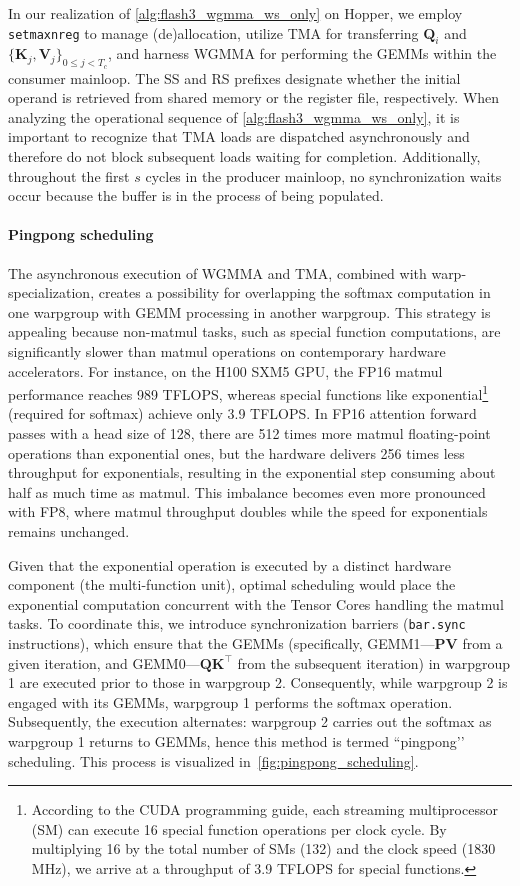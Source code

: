 In our realization of \cref{alg:flash3_wgmma_ws_only} on Hopper, we employ \verb|setmaxnreg| to manage (de)allocation, utilize TMA for transferring $\mathbf{Q}_i$ and $\{ \mathbf{K}_j, \mathbf{V}_j \}_{0 \leq j < T_c}$, and harness WGMMA for performing the GEMMs within the consumer mainloop. The SS and RS prefixes designate whether the initial operand is retrieved from shared memory or the register file, respectively. When analyzing the operational sequence of \cref{alg:flash3_wgmma_ws_only}, it is important to recognize that TMA loads are dispatched asynchronously and therefore do not block subsequent loads waiting for completion. Additionally, throughout the first $s$ cycles in the producer mainloop, no synchronization waits occur because the buffer is in the process of being populated.

\paragraph{Pingpong scheduling} The asynchronous execution of WGMMA and TMA, combined with warp-specialization, creates a possibility for overlapping the softmax computation in one warpgroup with GEMM processing in another warpgroup. This strategy is appealing because non-matmul tasks, such as special function computations, are significantly slower than matmul operations on contemporary hardware accelerators. For instance, on the H100 SXM5 GPU, the FP16 matmul performance reaches 989 TFLOPS, whereas special functions like exponential\footnote{According to the CUDA programming guide, each streaming multiprocessor (SM) can execute 16 special function operations per clock cycle. By multiplying 16 by the total number of SMs (132) and the clock speed (1830 MHz), we arrive at a throughput of 3.9 TFLOPS for special functions.} (required for softmax) achieve only 3.9 TFLOPS. In FP16 attention forward passes with a head size of 128, there are 512 times more matmul floating-point operations than exponential ones, but the hardware delivers 256 times less throughput for exponentials, resulting in the exponential step consuming about half as much time as matmul. This imbalance becomes even more pronounced with FP8, where matmul throughput doubles while the speed for exponentials remains unchanged.

Given that the exponential operation is executed by a distinct hardware component (the multi-function unit), optimal scheduling would place the exponential computation concurrent with the Tensor Cores handling the matmul tasks. To coordinate this, we introduce synchronization barriers (\texttt{bar.sync} instructions), which ensure that the GEMMs (specifically, GEMM1—$\mathbf{P} \mathbf{V}$ from a given iteration, and GEMM0—$\mathbf{Q} \mathbf{K}^\top$ from the subsequent iteration) in warpgroup 1 are executed prior to those in warpgroup 2. Consequently, while warpgroup 2 is engaged with its GEMMs, warpgroup 1 performs the softmax operation. Subsequently, the execution alternates: warpgroup 2 carries out the softmax as warpgroup 1 returns to GEMMs, hence this method is termed ``pingpong’’ scheduling. This process is visualized in~\cref{fig:pingpong_scheduling}. 

